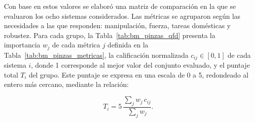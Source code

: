 Con base en estos valores se elaboró una matriz de comparación en la que se evaluaron los ocho sistemas considerados. Las métricas se agruparon según las necesidades a las que responden: manipulación, fuerza, tareas domésticas y robustez. Para cada grupo, la Tabla~\ref{tab:bm_pinzas_qfd} presenta la importancia $w_j$ de cada métrica $j$ definida en la Tabla~\ref{tab:bm_pinzas_metricas}, la calificación normalizada $c_{ij} \in [0,1]$ de cada sistema $i$, donde 1 corresponde al mejor valor del conjunto evaluado, y el puntaje total $T_i$ del grupo. Este puntaje se expresa en una escala de 0 a 5, redondeado al entero más cercano, mediante la relación:

\[
T_i = 5 \, \frac{\sum_j w_j \, c_{ij}}{\sum_j w_j}.
\]

\begingroup\scriptsize\setlength{\tabcolsep}{1pt}
